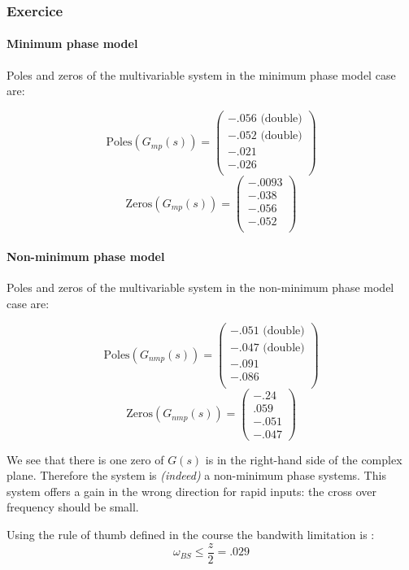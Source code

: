 \subsubsection{Exercice}

\paragraph{Minimum phase model}

Poles and zeros of the multivariable system in the minimum phase model case are:

$$
\text{Poles}(G_{mp}(s)) = 
    \left(\begin{array}{c}  
    -.056 \text{ (double)} \\
    -.052 \text{ (double)} \\
    -.021 \\
    -.026 \\
    \end{array}\right)
$$
$$
\text{Zeros}(G_{mp}(s)) = 
    \left(\begin{array}{c}
    -.0093 \\
    -.038 \\
    -.056 \\
    -.052 \\
    \end{array}\right)
$$

\paragraph{Non-minimum phase model}

Poles and zeros of the multivariable system in the non-minimum phase model case are:

$$
\text{Poles}(G_{nmp}(s)) = \left(\begin{array}{c} -.051 \text{ (double)}\\ -.047 \text{ (double)} \\-.091 \\ -.086\\ \end{array}\right)
$$
$$
\text{Zeros}(G_{nmp}(s)) = \left(\begin{array}{c} -.24\\ .059\\ -.051\\ -.047 \end{array}\right)
$$

We see that there is one zero of $G(s)$ is in the right-hand side of the complex plane.
Therefore the system is \emph{(indeed)} a non-minimum phase systems.
This system offers a gain in the wrong direction for rapid inputs: the cross over frequency should be small.

Using the rule of thumb defined in the course the bandwith limitation is :
$$
\omega_{BS} \leq \frac{z}{2} = .029
$$
